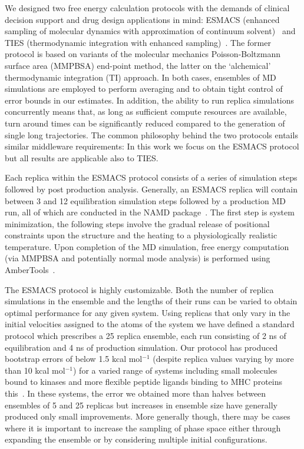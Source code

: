 We designed two free energy calculation protocols with the demands of clinical
decision support and drug design applications in mind: ESMACS (enhanced
sampling of molecular dynamics with approximation of continuum
solvent)~\cite{Wan2017brd4} and TIES (thermodynamic integration with enhanced
sampling)~\cite{Bhati2017}. The former protocol is based on variants of the
molecular mechanics Poisson-Boltzmann surface area (MMPBSA) end-point method,
the latter on the `alchemical' thermodynamic integration (TI) approach. In
both cases, ensembles of MD simulations are employed to perform averaging and
to obtain tight control of error bounds in our estimates. In addition, the
ability to run replica simulations concurrently means that, as long as
sufficient compute resources are available, turn around times can be
significantly reduced compared to the generation of single long trajectories.
The common philosophy behind the two protocols entails similar middleware
requirements: In this work we focus on the ESMACS protocol but all results are
applicable also to TIES.

Each replica within the ESMACS protocol consists of a series of simulation
steps followed by post production analysis. Generally, an ESMACS replica will
contain between 3 and 12 equilibration simulation steps followed by a
production MD run, all of which are conducted in the NAMD
package~\cite{Phillips2005}. The first step is system minimization, the
following steps involve the gradual release of positional constraints upon
the structure and the heating to a physiologically realistic temperature.
Upon completion of the MD simulation, free energy computation (via MMPBSA and
potentially normal mode analysis) is performed using
AmberTools~\cite{amber14, Case2005, MillerIII2012}.

The ESMACS protocol is highly customizable. Both the number of replica
simulations in the ensemble and the lengths of their runs can be varied to
obtain optimal performance for any given system. Using replicas that only
vary in the initial velocities assigned to the atoms of the system we have
defined a standard protocol which prescribes a 25 replica ensemble, each run
consisting of 2 ns of equilibration and 4 ns of production simulation. Our
protocol has produced bootstrap errors of below 1.5 kcal mol$^{-1}$ (despite
replica values varying by more than 10 kcal mol$^{-1}$) for a varied range of
systems including small molecules bound to kinases and more flexible peptide
ligands binding to MHC proteins this~\cite{Wan2015, Wright2014, Wan2017brd4}.
In these systems, the error we obtained more than halves between ensembles of
5 and 25 replicas but increases in ensemble size have generally produced only
small improvements. More generally though, there may be cases where it is
important to increase the sampling of phase space either through expanding
the ensemble or by considering multiple initial configurations.

